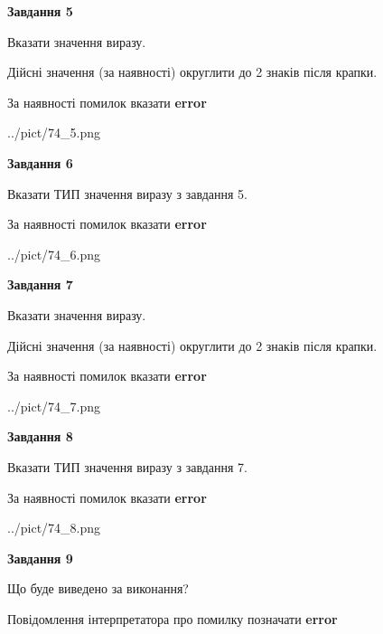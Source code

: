 \documentclass[11pt, ukrainian]{article}
\begin{document}
{\begin {large}
{\begin {center}\textbf{Завдання 5}\end {center}}\par
Вказати значення виразу. \par
Дійсні значення (за наявності) округлити до 2 знаків після крапки. \par
За наявності помилок вказати \textbf{error}

\begin{center}
	{../pict/74_5.png}
\end{center}
\newpage

{\begin {center}\textbf{Завдання 6}\end {center}}\par
Вказати ТИП значення виразу з завдання 5. \par
За наявності помилок вказати \textbf{error}

\begin{center}
	{../pict/74_6.png}
\end{center}
\newpage

{\begin {center}\textbf{Завдання 7}\end {center}}\par
Вказати значення виразу. \par
Дійсні значення (за наявності) округлити до 2 знаків після крапки. \par
За наявності помилок вказати \textbf{error}

\begin{center}
	{../pict/74_7.png}
\end{center}
\newpage

{\begin {center}\textbf{Завдання 8}\end {center}}\par
Вказати ТИП значення виразу з завдання 7. \par
За наявності помилок вказати \textbf{error}

\begin{center}
	{../pict/74_8.png}
\end{center}
\newpage

{\begin {center}\textbf{Завдання 9}\end {center}}\par
Що буде виведено за виконання? \par
Повідомлення інтерпретатора про помилку позначати \textbf{error}


\end{large}}
\end{document}
